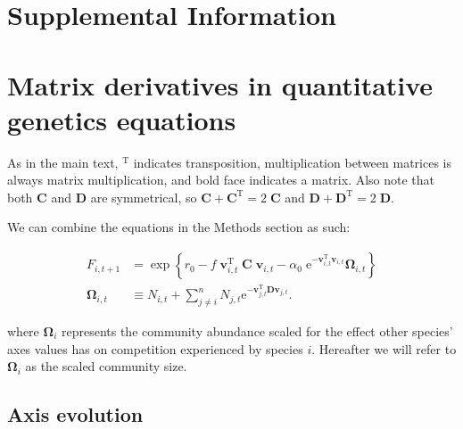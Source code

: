 

\section*{\huge{Supplemental Information}}

\renewcommand{\thefigure}{S\arabic{figure}}
\renewcommand{\theequation}{S\arabic{equation}}
\renewcommand{\thetable}{S\arabic{table}}
\setcounter{equation}{0}
\setcounter{figure}{0}
\setcounter{table}{0}



\section*{Matrix derivatives in quantitative genetics equations}

As in the main text, $^{\textrm{T}}$ indicates transposition,
multiplication between matrices is always matrix multiplication, and
bold face indicates a matrix.
Also note that both $\mathbf{C}$ and $\mathbf{D}$ are symmetrical,
so $\mathbf{C} + \mathbf{C}^{\textrm{T}} = 2 \; \mathbf{C}$ and
$\mathbf{D} + \mathbf{D}^{\textrm{T}} = 2 \; \mathbf{D}$.


We can combine the equations in the Methods section as such:

\begin{equation} \label{eq:fitness-full}
\begin{split}
    F_{i,t+1} &= \exp \left\{
        r_0 - f \; \mathbf{v}_{i,t}^{\textrm{T}} \; \mathbf{C} \; \mathbf{v}_{i,t} -
        \alpha_0 \;\textrm{e}^{- \mathbf{v}_{i,t}^{\textrm{T}} \mathbf{v}_{i,t} } \bm{\Omega}_{i,t}
        \right\} \\
        \bm{\Omega}_{i,t} &\equiv N_{i,t} +
            \sum_{j \ne i}^{n}{ N_{j,t} \textrm{e}^{
            - \mathbf{v}_{j,t}^{\textrm{T}}
            \mathbf{D} \mathbf{v}_{j,t} } }
        \textrm{.}
\end{split}
\end{equation}

\noindent where $\bm{\Omega}_i$ represents the community abundance scaled
for the effect other species' axes values has on competition
experienced by species $i$.
Hereafter we will refer to $\bm{\Omega}_i$ as the scaled community size.




\subsection*{Axis evolution}

